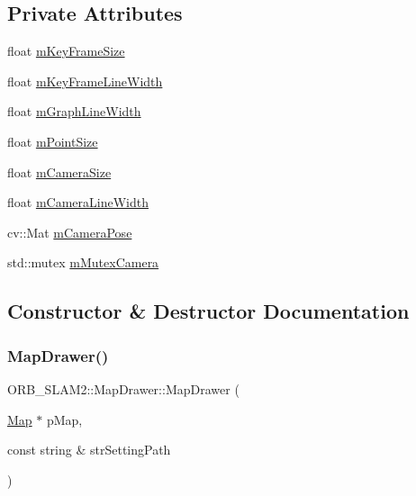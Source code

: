 \subsection*{Private Attributes}
\begin{DoxyCompactItemize}
\item 
float \mbox{\hyperlink{class_o_r_b___s_l_a_m2_1_1_map_drawer_af26fb341deb8fac97ff3c19e61326f21}{m\+Key\+Frame\+Size}}
\item 
float \mbox{\hyperlink{class_o_r_b___s_l_a_m2_1_1_map_drawer_afbdf0b3ccfbbbcec719d6c8b2ed5832d}{m\+Key\+Frame\+Line\+Width}}
\item 
float \mbox{\hyperlink{class_o_r_b___s_l_a_m2_1_1_map_drawer_a3ba8aa0b866fc4bfde76d5e8f592be7b}{m\+Graph\+Line\+Width}}
\item 
float \mbox{\hyperlink{class_o_r_b___s_l_a_m2_1_1_map_drawer_ad98a7d7b4aaee890a41696bef0786b84}{m\+Point\+Size}}
\item 
float \mbox{\hyperlink{class_o_r_b___s_l_a_m2_1_1_map_drawer_a485491f1257e132b10a4d129b4f3f9ce}{m\+Camera\+Size}}
\item 
float \mbox{\hyperlink{class_o_r_b___s_l_a_m2_1_1_map_drawer_a9d9d5a9b0b0c73ac47288bb31ab02487}{m\+Camera\+Line\+Width}}
\item 
cv\+::\+Mat \mbox{\hyperlink{class_o_r_b___s_l_a_m2_1_1_map_drawer_a1df47d70a2609cd77d7be569d053e908}{m\+Camera\+Pose}}
\item 
std\+::mutex \mbox{\hyperlink{class_o_r_b___s_l_a_m2_1_1_map_drawer_adf8ac349e12a7ae5b8c7e4af7a806ee5}{m\+Mutex\+Camera}}
\end{DoxyCompactItemize}


\subsection{Constructor \& Destructor Documentation}
\mbox{\label{class_o_r_b___s_l_a_m2_1_1_map_drawer_a649a10671736e192e85a6d824d776fc1}} 
\subsubsection{\texorpdfstring{Map\+Drawer()}{MapDrawer()}}
{\footnotesize\ttfamily O\+R\+B\+\_\+\+S\+L\+A\+M2\+::\+Map\+Drawer\+::\+Map\+Drawer (\begin{DoxyParamCaption}\item[{\mbox{\hyperlink{class_o_r_b___s_l_a_m2_1_1_map}{Map}} $\ast$}]{p\+Map,  }\item[{const string \&}]{str\+Setting\+Path }\end{DoxyParamCaption})}



